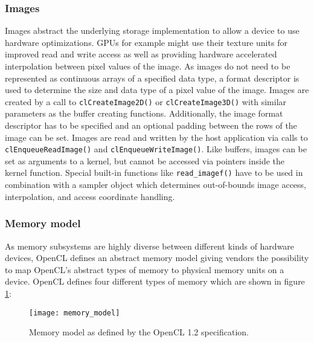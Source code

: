 \subsubsection{Images}
\label{sec:images}
Images abstract the underlying storage implementation to allow a device to use hardware optimizations. GPUs for example might use their texture units for improved read and write access as well as providing hardware accelerated interpolation between pixel values of the image. As images do not need to be represented as continuous arrays of a specified data type, a format descriptor is used to determine the size and data type of a pixel value of the image. Images are created by a call to \lstinline!clCreateImage2D()! or \lstinline!clCreateImage3D()! with similar parameters as the buffer creating functions. Additionally, the image format descriptor has to be specified and an optional padding between the rows of the image can be set. Images are read and written by the host application via calls to \lstinline!clEnqueueReadImage()! and \lstinline!clEnqueueWriteImage()!. Like buffers, images can be set as arguments to a kernel, but cannot be accessed via pointers inside the kernel function. Special built-in functions like \lstinline!read_imagef()! have to be used in combination with a sampler object which determines out-of-bounds image access, interpolation, and access coordinate handling. \cite[p.25f]{opencl_book}

\subsubsection{Memory model}
As memory subsystems are highly diverse between different kinds of hardware devices, OpenCL defines an abstract memory model giving vendors the possibility to map OpenCL's abstract types of memory to physical memory units on a device.
OpenCL defines four different types of memory which are shown in figure \ref{fig:memory_model}:

\begin{figure} 
\centering
\texttt{[image: memory\_model]}
\caption{Memory model as defined by the OpenCL 1.2 specification.\cite{opencl_spec}}
\label{fig:memory_model}
\end{figure}

